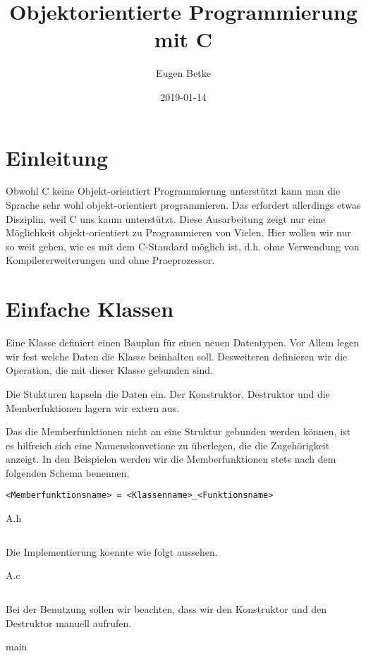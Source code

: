\documentclass{article}
\title{Objektorientierte Programmierung mit C}
\author{Eugen Betke}
\date{2019-01-14}
\newenvironment{code}{\captionsetup{type=listing}}{}
\begin{document}
\maketitle

\tableofcontents
\section{Einleitung}
Obwohl C keine Objekt-orientiert Programmierung unterstützt kann man die Sprache sehr wohl objekt-orientiert programmieren.
Das erfordert allerdings etwas Disziplin, weil C uns kaum unterstützt.
Diese Ausarbeitung zeigt nur eine Möglichkeit objekt-orientiert zu Programmieren von Vielen.
Hier wollen wir nur so weit gehen, wie es mit dem C-Standard möglich ist, d.h. ohne Verwendung von Kompilererweiterungen und ohne Praeprozessor.


\section{Einfache Klassen}
Eine Klasse definiert einen Bauplan für einen neuen Datentypen.
Vor Allem legen wir fest welche Daten die Klasse beinhalten soll.
Desweiteren definieren wir die Operation, die mit dieser Klasse gebunden sind.

Die Stukturen kapseln die Daten ein.
Der Konstruktor, Destruktor und die Memberfuktionen lagern wir extern aus.

Das die Memberfunktionen nicht an eine Struktur gebunden werden können, ist es hilfreich sich eine Namenskonvetione zu überlegen, die die Zugehörigkeit anzeigt. 
In den Beispielen werden wir die Memberfunktionen stets nach dem folgenden Schema benennen.
\begin{lstlisting}
<Memberfunktionsname> = <Klassenname>_<Funktionsname>
\end{lstlisting}

\begin{code}
	\caption{A.h}
	\inputminted{C}{code/simple_classes/A.h}
\end{code}

Die Implementierung koennte wie folgt aussehen.

\begin{code}
	\caption{A.c}
	\inputminted{C}{code/simple_classes/A.c}
\end{code}


Bei der Benutzung sollen wir beachten, dass wir den Konstruktor und den Destruktor manuell aufrufen. 

\begin{code}
	\caption{main}
	\inputminted{C}{code/simple_classes/main.c}
\end{code}
\end{document}
